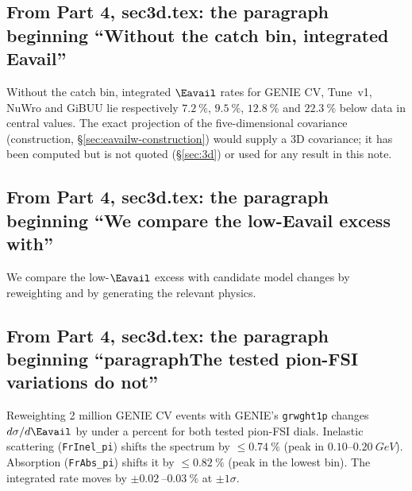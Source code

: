 \subsection{From Part 4, sec3d.tex: the paragraph beginning ``Without the catch bin, integrated Eavail''}
Without the catch bin, integrated $\Eavail$ rates for GENIE CV, Tune~v1, NuWro and GiBUU lie respectively $\SI{7.2}{\percent}$, $\SI{9.5}{\percent}$, $\SI{12.8}{\percent}$ and $\SI{22.3}{\percent}$ below data in central values. The exact projection of the five-dimensional covariance (construction, \S\ref{sec:eavailw-construction}) would supply a 3D covariance; it has been computed but is not quoted (\S\ref{sec:3d}) or used for any result in this note.

\subsection{From Part 4, sec3d.tex: the paragraph beginning ``We compare the low-Eavail excess with''}
We compare the low-$\Eavail$ excess with candidate model changes by reweighting and by generating the relevant physics.

\subsection{From Part 4, sec3d.tex: the paragraph beginning ``paragraphThe tested pion-FSI variations do not''}
Reweighting 2 million GENIE CV events with GENIE's \texttt{grwght1p} changes $d\sigma/d\Eavail$ by under a percent for both tested pion-FSI dials. Inelastic scattering (\texttt{FrInel\_pi}) shifts the spectrum by $\le\SI{0.74}{\percent}$ (peak in $0.10$--$\SI{0.20}{GeV}$). Absorption (\texttt{FrAbs\_pi}) shifts it by $\le\SI{0.82}{\percent}$ (peak in the lowest bin). The integrated rate moves by $\pm\SI{0.02}{}$--$\SI{0.03}{\percent}$ at $\pm1\sigma$.


